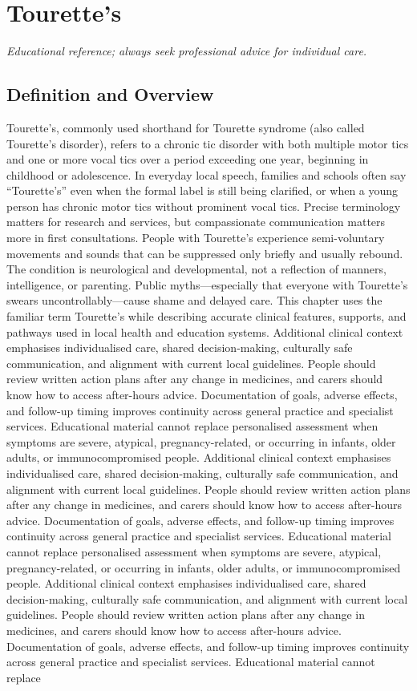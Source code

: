 \chapter{Tourette's}
\medskip
\noindent\textit{Educational reference; always seek professional advice for individual care.}

\section*{Definition and Overview}
Tourette's, commonly used shorthand for Tourette syndrome (also called Tourette's disorder), refers to a chronic tic disorder with both multiple motor tics and one or more vocal tics over a period exceeding one year, beginning in childhood or adolescence. In everyday local speech, families and schools often say ``Tourette's'' even when the formal label is still being clarified, or when a young person has chronic motor tics without prominent vocal tics. Precise terminology matters for research and services, but compassionate communication matters more in first consultations. People with Tourette's experience semi-voluntary movements and sounds that can be suppressed only briefly and usually rebound. The condition is neurological and developmental, not a reflection of manners, intelligence, or parenting. Public myths---especially that everyone with Tourette's swears uncontrollably---cause shame and delayed care. This chapter uses the familiar term Tourette's while describing accurate clinical features, supports, and pathways used in local health and education systems. Additional clinical context emphasises individualised care, shared decision-making, culturally safe communication, and alignment with current local guidelines. People should review written action plans after any change in medicines, and carers should know how to access after-hours advice. Documentation of goals, adverse effects, and follow-up timing improves continuity across general practice and specialist services. Educational material cannot replace personalised assessment when symptoms are severe, atypical, pregnancy-related, or occurring in infants, older adults, or immunocompromised people. Additional clinical context emphasises individualised care, shared decision-making, culturally safe communication, and alignment with current local guidelines. People should review written action plans after any change in medicines, and carers should know how to access after-hours advice. Documentation of goals, adverse effects, and follow-up timing improves continuity across general practice and specialist services. Educational material cannot replace personalised assessment when symptoms are severe, atypical, pregnancy-related, or occurring in infants, older adults, or immunocompromised people. Additional clinical context emphasises individualised care, shared decision-making, culturally safe communication, and alignment with current local guidelines. People should review written action plans after any change in medicines, and carers should know how to access after-hours advice. Documentation of goals, adverse effects, and follow-up timing improves continuity across general practice and specialist services. Educational material cannot replace 